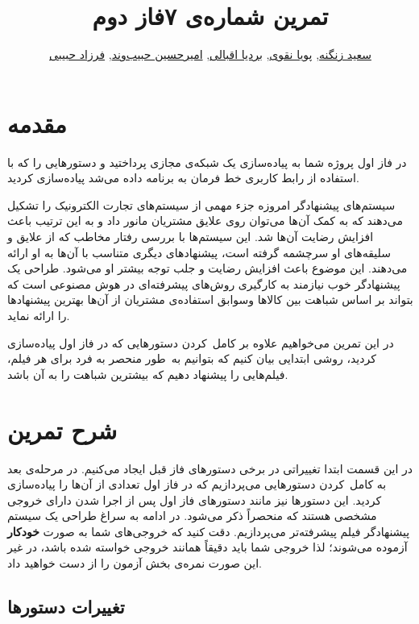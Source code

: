 \documentclass{utap}
\title{تمرین شماره‌ی ۷\normalsize\qquad فاز دوم}
\author{%
    \href{mailto:zangenehsaeed412@gmail.com?subject=[AP\%20S98\%20A7]\%20}{سعید زنگنه},
    \href{mailto:naghavi.pooya@gmail.com?subject=[AP\%20S98\%20A7]\%20}{پویا نقوی},
    \href{mailto:bardia.eghbali@gmail.com?subject=[AP\%20S98\%20A7]\%20}{بردیا اقبالی},
    \href{mailto:ahhabibvand@gmail.com?subject=[AP\%20S98\%20A7]\%20}{امیرحسین حبیب‌وند},
    \href{mailto:farzadhabibii98@gmail.com?subject=[AP\%20S98\%20A7]\%20}{فرزاد حبیبی}
}
\begin{document}
    \maketitle

    \section{مقدمه}

    در فاز اول پروژه شما به پیاده‌سازی یک شبکه‌ی مجازی پرداختید و دستورهایی را که با استفاده از رابط کاربری خط فرمان به برنامه داده می‌شد پیاده‌سازی کردید.

    سیستم‌های پیشنهادگر امروزه جزء مهمی از سیستم‌های تجارت الکترونیک را تشکیل می‌دهند که به کمک آن‌ها می‌توان روی علایق مشتریان مانور داد و به این ترتیب باعث افزایش رضایت آن‌ها شد. این سیستم‌ها با بررسی رفتار مخاطب که از علایق و سلیقه‌های او سرچشمه گرفته است، پیشنهاد‌های دیگری متناسب با آن‌ها به او ارائه می‌دهند. این موضوع باعث افزایش رضایت و جلب توجه بیشتر او می‌شود.
    طراحی یک پیشنهاد‌گر خوب نیازمند به کارگیری روش‌های پیشرفته‌ای در هوش مصنوعی است که بتواند بر اساس شباهت‌ بین کالاها وسوابق استفاده‌ی مشتریان از آن‌ها بهترین پیشنهاد‌ها را ارائه نماید.

    در این تمرین می‌خواهیم علاوه بر کامل~کردن دستورهایی که در فاز اول پیاده‌سازی کردید، روشی ابتدایی بیان کنیم که بتوانیم به~طور منحصر به فرد برای هر فیلم، فیلم‌هایی را پیشنهاد دهیم که بیشترین شباهت را به آن باشد.

    \section{شرح تمرین}

    در این قسمت ابتدا تغییراتی در برخی دستورهای فاز قبل ایجاد می‌کنیم.
    در مرحله‌ی بعد به کامل~کردن دستورهایی می‌پردازیم که در فاز اول تعدادی از آن‌ها را پیاده‌سازی کردید. این دستورها نیز مانند دستورهای فاز اول پس از اجرا شدن دارای خروجی مشخصی هستند که منحصراً ذکر می‌شود.
    در ادامه به سراغ طراحی یک سیستم پیشنهادگر فیلم پیشرفته‌تر می‌پردازیم.
    دقت کنید که خروجی‌های شما به صورت \textbf{خودکار} آزموده می‌شوند؛ لذا خروجی شما باید دقیقاً همانند خروجی خواسته شده باشد، در غیر این صورت نمره‌ی بخش آزمون را از دست خواهید داد.

    \subsection{تغییرات دستورها}
\end{document}
